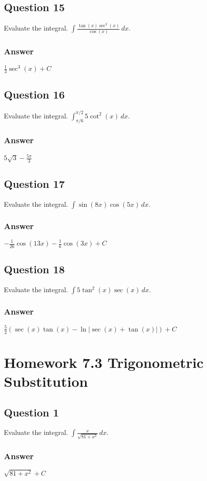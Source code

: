 \documentclass{article}
\begin{document}
\subsection*{Question 15}
Evaluate the integral. $\int \frac{\tan(x)\sec^2(x)}{\cos(x)} \,dx$.
\subsubsection*{Answer}
$ \frac{1}{3}\sec^3(x) + C $

\subsection*{Question 16}
Evaluate the integral. $\int_{\pi/6}^{\pi/2} 5\cot^2(x) \,dx$.
\subsubsection*{Answer}
$ 5\sqrt{3} - \frac{5\pi}{3} $

\subsection*{Question 17}
Evaluate the integral. $\int \sin(8x)\cos(5x) \,dx$.
\subsubsection*{Answer}
$ -\frac{1}{26}\cos(13x) - \frac{1}{6}\cos(3x) + C $

\subsection*{Question 18}
Evaluate the integral. $\int 5\tan^2(x)\sec(x) \,dx$.
\subsubsection*{Answer}
$ \frac{5}{2}(\sec(x)\tan(x) - \ln|\sec(x)+\tan(x)|) + C $

\newpage
\section{Homework 7.3 Trigonometric Substitution}

\subsection*{Question 1}
Evaluate the integral. $\int \frac{x}{\sqrt{81+x^2}} \,dx$.
\subsubsection*{Answer}
$ \sqrt{81+x^2} + C $
\end{document}
